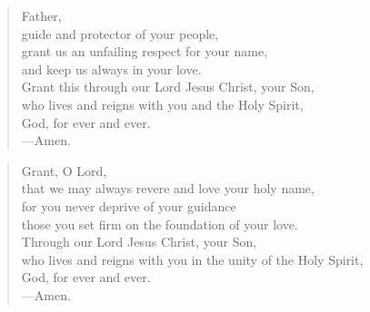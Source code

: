 \prayer

\setlength{\leftmargini}{\prayerleftmargini}

\begin{verse}
Father,\\
guide and protector of your people,\\
grant us an unfailing respect for your name,\\
and keep us always in your love.\\
Grant this through our Lord Jesus Christ, your Son,\\
who lives and reigns with you and the Holy Spirit,\\
God, for ever and ever.\\
{\color{red}---\thinspace}Amen.
\end{verse}


\begin{verse}
Grant, O Lord,\\
that we may always revere and love your holy name,\\
for you never deprive of your guidance\\
those you set firm on the foundation of your love.\\
Through our Lord Jesus Christ, your Son,\\
who lives and reigns with you in the unity of the Holy Spirit,\\
God, for ever and ever.\\
{\color{red}---\thinspace}Amen.
\end{verse}

\setlength{\leftmargini}{\defleftmargini}